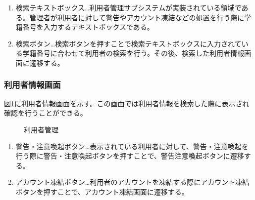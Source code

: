 \documentclass[a4j]{jarticle}
\begin{document}
\begin{enumerate}
  \renewcommand{\labelenumi}{\textcircled{\scriptsize \theenumi}}

\item 検索テキストボックス…利用者管理サブシステムが実装されている領域である。管理者が利用者に対して警告やアカウント凍結などの処置を行う際に学籍番号を入力するテキストボックスである。

\item 検索ボタン…検索ボタンを押すことで検索テキストボックスに入力されている学籍番号に合わせて利用者の検索を行う。その後、検索した利用者情報画面に遷移する。


\end{enumerate}


\subsubsection{利用者情報画面}
図\ref{fig:user_info}に利用者情報画面を示す。この画面では利用者情報を検索した際に表示され確認を行うことができる。
\begin{figure}[H]
\centering
{}
\caption{利用者管理}
\label{fig:user_info}
\end{figure}

\begin{enumerate}
  \renewcommand{\labelenumi}{\textcircled{\scriptsize \theenumi}}

\item 警告・注意喚起ボタン…表示されている利用者に対して、警告・注意喚起を行う際に警告・注意喚起ボタンを押すことで、警告注意喚起ボタンに遷移する。
\item アカウント凍結ボタン…利用者のアカウントを凍結する際にアカウント凍結ボタンを押すことで、アカウント凍結画面に遷移する。

\end{enumerate}
\end{document}
